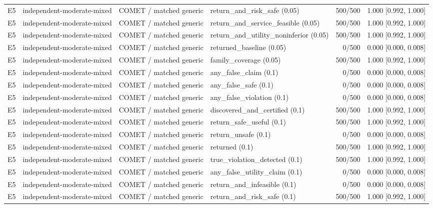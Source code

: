 \begin{longtable}{p{.04\linewidth}p{.18\linewidth}p{.19\linewidth}p{.16\linewidth}r p{.21\linewidth}}
E5 & independent-moderate-mixed & COMET / matched generic & return\_and\_risk\_safe (0.05) & 500/500 & 1.000 [0.992, 1.000]\\
E5 & independent-moderate-mixed & COMET / matched generic & return\_and\_service\_feasible (0.05) & 500/500 & 1.000 [0.992, 1.000]\\
E5 & independent-moderate-mixed & COMET / matched generic & return\_and\_utility\_noninferior (0.05) & 500/500 & 1.000 [0.992, 1.000]\\
E5 & independent-moderate-mixed & COMET / matched generic & returned\_baseline (0.05) & 0/500 & 0.000 [0.000, 0.008]\\
E5 & independent-moderate-mixed & COMET / matched generic & family\_coverage (0.05) & 500/500 & 1.000 [0.992, 1.000]\\
E5 & independent-moderate-mixed & COMET / matched generic & any\_false\_claim (0.1) & 0/500 & 0.000 [0.000, 0.008]\\
E5 & independent-moderate-mixed & COMET / matched generic & any\_false\_safe (0.1) & 0/500 & 0.000 [0.000, 0.008]\\
E5 & independent-moderate-mixed & COMET / matched generic & any\_false\_violation (0.1) & 0/500 & 0.000 [0.000, 0.008]\\
E5 & independent-moderate-mixed & COMET / matched generic & discovered\_and\_certified (0.1) & 500/500 & 1.000 [0.992, 1.000]\\
E5 & independent-moderate-mixed & COMET / matched generic & return\_safe\_useful (0.1) & 500/500 & 1.000 [0.992, 1.000]\\
E5 & independent-moderate-mixed & COMET / matched generic & return\_unsafe (0.1) & 0/500 & 0.000 [0.000, 0.008]\\
E5 & independent-moderate-mixed & COMET / matched generic & returned (0.1) & 500/500 & 1.000 [0.992, 1.000]\\
E5 & independent-moderate-mixed & COMET / matched generic & true\_violation\_detected (0.1) & 500/500 & 1.000 [0.992, 1.000]\\
E5 & independent-moderate-mixed & COMET / matched generic & any\_false\_utility\_claim (0.1) & 0/500 & 0.000 [0.000, 0.008]\\
E5 & independent-moderate-mixed & COMET / matched generic & return\_and\_infeasible (0.1) & 0/500 & 0.000 [0.000, 0.008]\\
E5 & independent-moderate-mixed & COMET / matched generic & return\_and\_risk\_safe (0.1) & 500/500 & 1.000 [0.992, 1.000]\\

\end{longtable}
